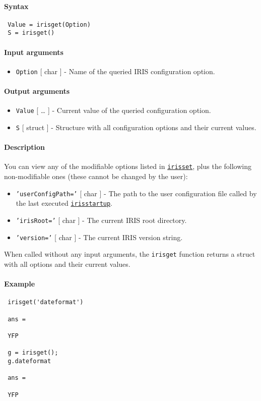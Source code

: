 


	\paragraph{Syntax}
 
 \begin{verbatim}
 Value = irisget(Option)
 S = irisget()
 \end{verbatim}
 
 \paragraph{Input arguments}
 
 \begin{itemize}
 \item
   \texttt{Option} {[} char {]} - Name of the queried IRIS configuration
   option.
 \end{itemize}
 
 \paragraph{Output arguments}
 
 \begin{itemize}
 \item
   \texttt{Value} {[} \ldots{} {]} - Current value of the queried
   configuration option.
 \item
   \texttt{S} {[} struct {]} - Structure with all configuration options
   and their current values.
 \end{itemize}
 
 \paragraph{Description}
 
 You can view any of the modifiable options listed in
 \href{config/irisset}{\texttt{irisset}}, plus the following
 non-modifiable ones (these cannot be changed by the user):
 
 \begin{itemize}
 \item
   \texttt{'userConfigPath='} {[} char {]} - The path to the user
   configuration file called by the last executed
   \href{config/irisstartup}{\texttt{irisstartup}}.
 \item
   \texttt{'irisRoot='} {[} char {]} - The current IRIS root directory.
 \item
   \texttt{'version='} {[} char {]} - The current IRIS version string.
 \end{itemize}
 
 When called without any input arguments, the \texttt{irisget} function
 returns a struct with all options and their current values.
 
 \paragraph{Example}
 
 \begin{verbatim}
 irisget('dateformat')
 
 ans =
 
 YFP
 
 g = irisget();
 g.dateformat
 
 ans =
 
 YFP
 \end{verbatim}


